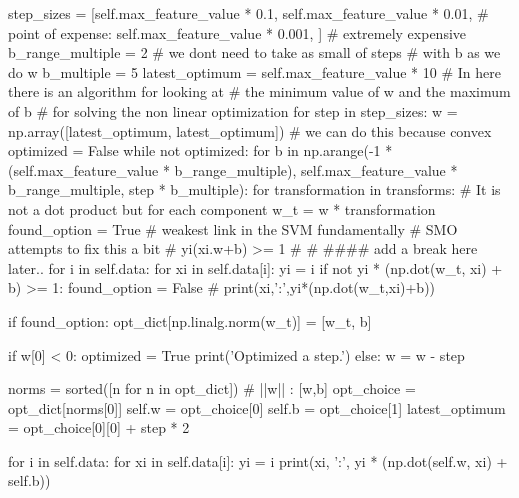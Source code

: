 \documentclass[11pt]{article}
\begin{document}
\begin{python}
        step_sizes = [self.max_feature_value * 0.1,
                      self.max_feature_value * 0.01,
                      # point of expense:
                      self.max_feature_value * 0.001,
                      ]
        # extremely expensive
        b_range_multiple = 2
        # we dont need to take as small of steps
        # with b as we do w
        b_multiple = 5
        latest_optimum = self.max_feature_value * 10
        # In here there is an algorithm for looking at
        # the minimum value of w and the maximum of b
        # for solving the non linear optimization
        for step in step_sizes:
            w = np.array([latest_optimum, latest_optimum])
            # we can do this because convex
            optimized = False
            while not optimized:
                for b in np.arange(-1 * (self.max_feature_value *
                                         b_range_multiple),
                                   self.max_feature_value * 
                                   b_range_multiple,
                                   step * b_multiple):
                    for transformation in transforms:
                        # It is not a dot product but for each component
                        w_t = w * transformation
                        found_option = True
                        # weakest link in the SVM fundamentally
                        # SMO attempts to fix this a bit
                        # yi(xi.w+b) >= 1
                        #
                        # #### add a break here later..
                        for i in self.data:
                            for xi in self.data[i]:
                                yi = i
                                if not yi * (np.dot(w_t, xi) + b) >= 1:
                                    found_option = False
                                    # print(xi,':',yi*(np.dot(w_t,xi)+b))

                        if found_option:
                            opt_dict[np.linalg.norm(w_t)] = [w_t, b]

                if w[0] < 0:
                    optimized = True
                    print('Optimized a step.')
                else:
                    w = w - step

            norms = sorted([n for n in opt_dict])
            # ||w|| : [w,b]
            opt_choice = opt_dict[norms[0]]
            self.w = opt_choice[0]
            self.b = opt_choice[1]
            latest_optimum = opt_choice[0][0] + step * 2

        for i in self.data:
            for xi in self.data[i]:
                yi = i
                print(xi, ':', yi * (np.dot(self.w, xi) + self.b))


\end{python}
\end{document}
